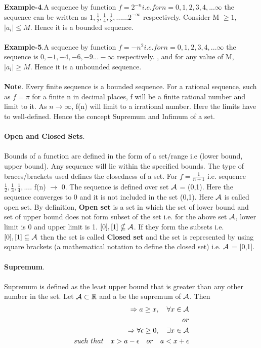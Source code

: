 \documentclass[a4paper]{article}
\begin{document}
\\
\\
\textbf{Example-4}.A sequence by function $f=2^{-n} i.e. for n=0, 1 ,2,3,4,...\infty$ the sequence can be written as $1,\frac{1}{2},\frac{1}{4},\frac{1}{8},......2^{-\infty}$ respectively. Consider M $\geq 1$, $\mid a_i \mid \leq M $. Hence it is a bounded sequence.
\\
\\
\textbf{Example-5}.A sequence by function $f=-n^2 i.e. for n=0, 1 ,2,3,4,...\infty$ the sequence is $0,-1,-4,-6,-9...-\infty$ respectively. , and for any value of M, $\mid a_i \mid \geq M $. Hence it is a unbounded sequence. 
\\
\\
\textbf{Note}. Every finite sequence is a bounded sequence. For a rational sequence, such as $f=\pi$ for a finite n in decimal places, f will be a finite rational number and limit to it. As $n \to \infty$, f(n) will limit to a irrational number. Here the limits have to well-defined. Hence the concept Supremum and Infimum of a set.
\\
\\
\textbf{Open and Closed Sets}.
\\
\\
Bounds of a function are defined in the form of a set/range i.e (lower bound, upper bound). Any sequence will lie within the specified bounds. The type of braces/brackets used defines the closedness of a set. For $f=\frac{1}{n+1}$ i.e. sequence $\frac{1}{2},\frac{1}{3},\frac{1}{4},....$ f(n) $\to$ 0. The sequence is defined over set $\mathcal A$ = (0,1). Here the sequence converges to 0 and it is not included in the set (0,1). Here $\mathcal A$ is called open set. By definition, \textbf{Open set} is a set in which the set of lower bound and set of upper bound does not form subset of the set i.e. for the above set $\mathcal A$, lower limit is 0 and upper limit is 1. ${[0]},{[1]} \nsubseteq \mathcal A$. If they form the subsets i.e. ${[0]},{[1]} \subseteq \mathcal A$ then the set is called \textbf{Closed set} and the set is represented by using square brackets (a mathematical notation to define the closed set) i.e. $\mathcal A$ = [0,1].
\\
\\
\textbf{Supremum}.
\\
\\
Supremum is defined as the least upper bound that is greater than any other number in the set. Let $\mathcal A \subset \mathbb R$ and a be the supremum of $\mathcal A$. Then\\
\begin{align}
\begin{split}
\Rightarrow a \geq x,\quad \forall x \in \mathcal A\\
or\\
\Rightarrow \forall \epsilon \geq 0,\quad \exists x \in \mathcal A 
\\such \ that \quad x > a-\epsilon \quad or \quad a < x+\epsilon
\end{split}
\end{align}
\end{document}
